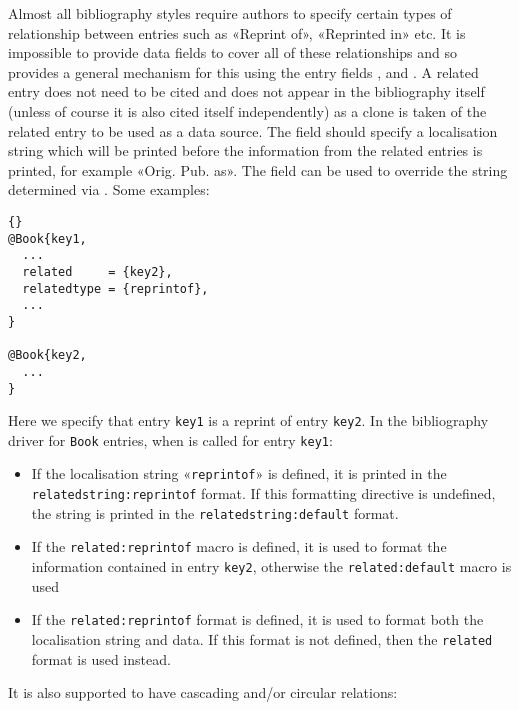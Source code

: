 \documentclass{ltxdockit}[2011/03/25]
\newcommand*{\biblatex}{\sty{biblatex}\xspace}
\begin{document}
Almost all bibliography styles require authors to specify certain types of relationship between entries such as «Reprint of», «Reprinted in» etc. It is impossible to provide data fields to cover all of these relationships and so \biblatex provides a general mechanism for this using the entry fields ,  and . A related entry does not need to be cited and does not appear in the bibliography itself (unless of course it is also cited itself independently) as a clone is taken of the related entry to be used as a data source. The  field should specify a localisation string which will be printed before the information from the related entries is printed, for example «Orig. Pub. as». The  field can be used to override the string determined via . Some examples:

\begin{lstlisting}[style=bibtex]{}
@Book{key1,
  ...
  related     = {key2},
  relatedtype = {reprintof},
  ...
}

@Book{key2,
  ...
}
\end{lstlisting}
%
Here we specify that entry \texttt{key1} is a reprint of entry \texttt{key2}. In the bibliography driver for \texttt{Book} entries, when  is called for entry \texttt{key1}:

\begin{itemize}
\item If the localisation string «\texttt{reprintof}» is defined, it is printed in the \texttt{relatedstring:reprintof} format. If this formatting directive is undefined, the string is printed in the \texttt{relatedstring:default} format.
\item If the \texttt{related:reprintof} macro is defined, it is used to format the information contained in entry \texttt{key2}, otherwise the \texttt{related:default} macro is used
\item If the \texttt{related:reprintof} format is defined, it is used to format both the localisation string and data. If this format is not defined, then the \texttt{related} format is used instead.
\end{itemize}
%
It is also supported to have cascading and/or circular relations:
\end{document}
